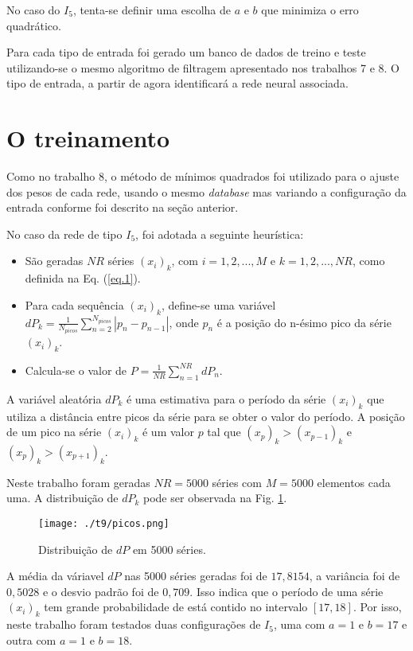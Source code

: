 \documentclass[10pt,journal,letterpaper,compsoc]{IEEEtran}
\newcommand{\fra}[2]{
	\displaystyle \frac{{#1}}{{#2}} 
}
\newcommand{\su}[2]{
	\displaystyle \sum_{#1}^{#2}
}
\begin{document}
No caso do $I_5$, tenta-se definir uma escolha de $a$ e $b$ que minimiza o erro quadrático.

Para cada tipo de entrada foi gerado um banco de dados de treino e teste utilizando-se o mesmo algoritmo
de filtragem apresentado nos trabalhos 7 e 8. O tipo de entrada, a partir de agora identificará a rede
neural associada.

\section{O treinamento \label{treina}}

Como no trabalho 8, o método de mínimos quadrados foi utilizado para o ajuste dos pesos de cada rede,
usando o mesmo {\it database} mas variando a configuração da entrada conforme foi descrito na seção anterior.

No caso da rede de tipo $I_5$, foi adotada a seguinte heurística:

\begin{itemize}
\item São geradas $NR$ séries $(x_i)_k$, com $i = 1, 2, ... ,M$ e $k = 1, 2, ... , NR$,
como definida na Eq. (\ref{eq.1}).
\item Para cada sequência $(x_i)_k$, define-se uma variável 
$dP_k = \fra{1}{N_{picos}}\su{n=2}{N_{picos}}|p_n - p_{n-1}|$, onde $p_n$ é
a posição do n-ésimo pico da série $(x_i)_k$.
\item Calcula-se o valor de $P = \fra{1}{NR} \su{n = 1} {NR}dP_n$.
\end{itemize}

A variável aleatória $dP_k$ é uma estimativa para o período da série $(x_i)_k$ que utiliza a distância 
entre picos da série para se obter o valor do período. A posição de um pico na série $(x_i)_k$ é um
valor $p$ tal que $(x_p)_k > (x_{p-1})_k$ e $(x_p)_k > (x_{p+1})_k$.

Neste trabalho foram geradas $NR = 5000$ séries com $M = 5000$ elementos cada uma. A distribuição de
$dP_k$ pode ser observada na Fig. \ref{fig.picos}.


\begin{figure}[!htb]
     \centering
     \texttt{[image: ./t9/picos.png]}
     \caption{Distribuição de $dP$ em 5000 séries.}
     \label{fig.picos}
\end{figure}

A média da váriavel $dP$ nas 5000 séries geradas foi de $17,8154$, a variância foi de $0,5028$ e
o desvio padrão foi de $0,709$. Isso indica que o período de uma série $(x_i)_k$ tem grande probabilidade
de está contido no intervalo $[17, 18]$. Por isso, neste trabalho foram testados duas configurações de $I_5$,
uma com $a=1$ e $b=17$ e outra com $a=1$ e $b=18$.
\end{document}
